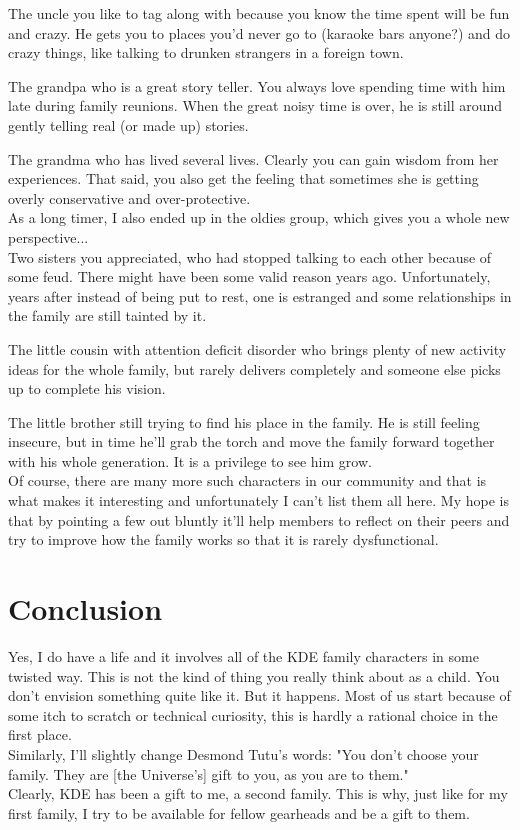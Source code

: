The uncle you like to tag along with because you know the time spent will be
fun and crazy. He gets you to places you'd never go to (karaoke bars anyone?)
and do crazy things, like talking to drunken strangers in a foreign town.

The grandpa who is a great story teller. You always love spending time with him
late during family reunions. When the great noisy time is over, he is still
around gently telling real (or made up) stories.

The grandma who has lived several lives. Clearly you can gain wisdom from her
experiences. That said, you also get the feeling that sometimes she is getting
overly conservative and over-protective. \\

As a long timer, I also ended up in the oldies group, which gives you a whole
new perspective... \\

Two sisters you appreciated, who had stopped talking to each other because of some feud.
There might have been some valid reason years ago. Unfortunately, years after
instead of being put to rest, one is estranged and some relationships in the
family are still tainted by it.

The little cousin with attention deficit disorder who brings plenty of new activity
ideas for the whole family, but rarely delivers completely
and someone else picks up to complete his vision.

The little brother still trying to find his place in the family. He is still
feeling insecure, but in time he'll grab the torch and move the family forward
together with his whole generation. It is a privilege to see him grow. \\

Of course, there are many more such characters in our community and that is what
makes it interesting and unfortunately I can't list them all here. My hope is that
by pointing a few out bluntly it'll help members to reflect on their peers and
try to improve how the family works so that it is rarely dysfunctional.

\section*{Conclusion}
Yes, I do have a life and it involves all of the KDE family characters in some
twisted way. This is not the kind of thing you really think about as a child. You
don't envision something quite like it. But it happens. Most of us start because
of some itch to scratch or technical curiosity, this is hardly a rational choice
in the first place. \\

Similarly, I'll slightly change Desmond Tutu's words: "You don’t choose your
family. They are [the Universe's] gift to you, as you are to them." \\

Clearly, KDE has been a gift to me, a second family. This is why, just like for
my first family, I try to be available for fellow gearheads and be a gift to
them.

